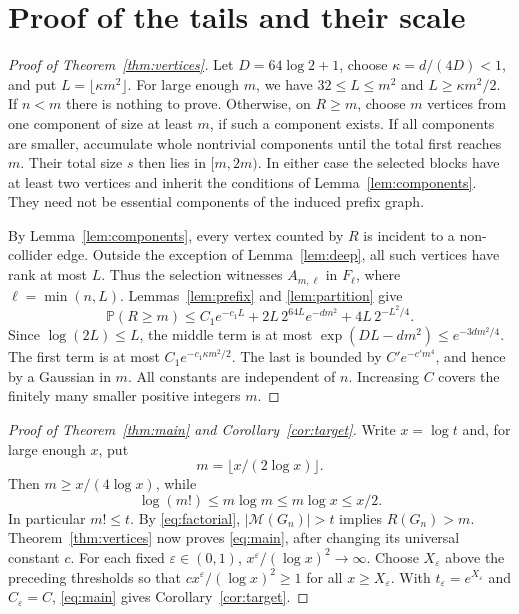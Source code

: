 \documentclass[11pt]{article}
\theoremstyle{remark}
\newcommand{\Prob}{\mathbb P}
\newcommand{\M}{\mathcal M}
\begin{document}
\section{Proof of the tails and their scale}
\begin{proof}[Proof of Theorem~\ref{thm:vertices}]
Let $D=64\log2+1$, choose $\kappa=d/(4D)<1$, and put
$L=\lfloor\kappa m^2\rfloor$. For large enough $m$, we have
$32\le L\le m^2$ and $L\ge\kappa m^2/2$. If $n<m$ there is nothing
to prove. Otherwise, on $R\ge m$, choose $m$ vertices from one component
of size at least $m$, if such a component exists. If all components are
smaller, accumulate whole nontrivial components until the total first
reaches $m$. Their total size $s$ then lies in $[m,2m)$.
In either case the selected blocks have at least two vertices and inherit
the conditions of Lemma~\ref{lem:components}. They need not be essential
components of the induced prefix graph.

By Lemma~\ref{lem:components}, every vertex counted by $R$ is incident to
a non-collider edge. Outside the exception of Lemma~\ref{lem:deep}, all
such vertices have rank at most $L$. Thus the selection witnesses
$A_{m,\ell}$ in $F_\ell$, where $\ell=\min(n,L)$. Lemmas~\ref{lem:prefix}
and \ref{lem:partition} give
\begin{equation}\label{eq:combine}
 \Prob(R\ge m)
 \le C_1 e^{-c_1L}
       +2L\,2^{64L}e^{-dm^2}
       +4L\,2^{-L^2/4}.
\end{equation}
Since $\log(2L)\le L$, the middle term is at most
$\exp(DL-dm^2)\le e^{-3dm^2/4}$. The first term is at most
$C_1e^{-c_1\kappa m^2/2}$. The last is bounded by
$C'e^{-c'm^4}$, and hence by a Gaussian in $m$.
All constants are independent of $n$. Increasing $C$ covers the finitely
many smaller positive integers $m$.
\end{proof}

\begin{proof}[Proof of Theorem~\ref{thm:main} and Corollary~\ref{cor:target}]
Write $x=\log t$ and, for large enough $x$, put
\[
 m=\lfloor x/(2\log x)\rfloor.
\]
Then $m\ge x/(4\log x)$, while
\[
 \log(m!)\le m\log m\le m\log x\le x/2.
\]
In particular $m!\le t$. By \eqref{eq:factorial}, $|\M(G_n)|>t$
implies $R(G_n)>m$. Theorem~\ref{thm:vertices} now proves
\eqref{eq:main}, after changing its universal constant $c$.
For each fixed $\varepsilon\in(0,1)$,
$x^\varepsilon/(\log x)^2\to\infty$. Choose $X_\varepsilon$ above the
preceding thresholds so that $c x^\varepsilon/(\log x)^2\ge1$ for
all $x\ge X_\varepsilon$. With $t_\varepsilon=e^{X_\varepsilon}$ and
$C_\varepsilon=C$, \eqref{eq:main} gives Corollary~\ref{cor:target}.
\end{proof}
\end{document}
